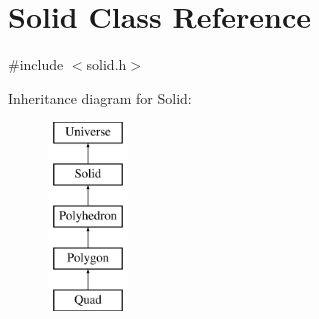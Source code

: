 \hypertarget{classSolid}{}\section{Solid Class Reference}
\label{classSolid}


{\ttfamily \#include $<$solid.\+h$>$}

Inheritance diagram for Solid\+:\begin{figure}[H]
\begin{center}
\leavevmode
\includegraphics[height=5.000000cm]{classSolid}
\end{center}
\end{figure}
